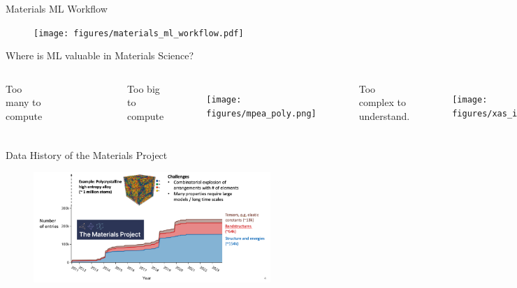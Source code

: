 \documentclass[aspectratio=169]{beamer}
\begin{document}
    \begin{frame}[t]{Materials ML Workflow}
        \begin{figure}
            \centering
            \texttt{[image: figures/materials\_ml\_workflow.pdf]}
        \end{figure}
    \end{frame}


    \begin{frame}[t]{Where is ML valuable in Materials Science?}
        \begin{columns}[t]
            Too many to compute
            \begin{figure}
                \centering
                \includegraphics[width=\textwidth]{figures/mp_data_hist.png}
            \end{figure}
            Too big to compute
            \begin{figure}
                \centering
                \texttt{[image: figures/mpea\_poly.png]}
            \end{figure}
            Too complex to understand.
            \begin{figure}
                \centering
                \texttt{[image: figures/xas\_interpretation.png]}
            \end{figure}
        \end{columns}
    \end{frame}


    \begin{frame}{Data History of the Materials Project}
        \begin{figure}
            \centering
            \includegraphics[width=0.8\textwidth]{figures/mp_data_hist.png}
        \end{figure}
    \end{frame}
\end{document}
